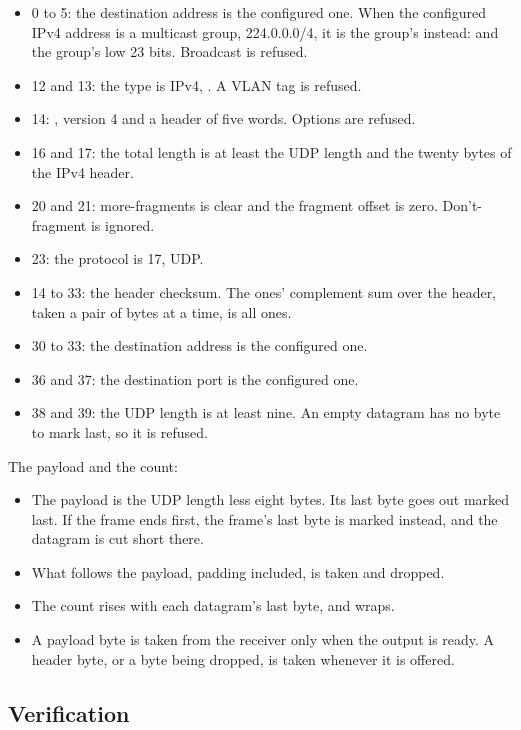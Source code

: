 \begin{itemize}
\item 0 to 5: the destination address is the configured one. When the
configured IPv4 address is a multicast group, 224.0.0.0/4, it is the
group's instead:  and the group's low 23 bits.
Broadcast is refused.
\item 12 and 13: the type is IPv4, . A VLAN tag is
refused.
\item 14: , version 4 and a header of five words. Options
are refused.
\item 16 and 17: the total length is at least the UDP length and the
twenty bytes of the IPv4 header.
\item 20 and 21: more-fragments is clear and the fragment offset is
zero. Don't-fragment is ignored.
\item 23: the protocol is 17, UDP.
\item 14 to 33: the header checksum. The ones' complement sum over the
header, taken a pair of bytes at a time, is all ones.
\item 30 to 33: the destination address is the configured one.
\item 36 and 37: the destination port is the configured one.
\item 38 and 39: the UDP length is at least nine. An empty datagram
has no byte to mark last, so it is refused.
\end{itemize}

The payload and the count:

\begin{itemize}
\item The payload is the UDP length less eight bytes. Its last byte
goes out marked last. If the frame ends first, the frame's last byte
is marked instead, and the datagram is cut short there.
\item What follows the payload, padding included, is taken and
dropped.
\item The count rises with each datagram's last byte, and wraps.
\item A payload byte is taken from the receiver only when the output
is ready. A header byte, or a byte being dropped, is taken whenever it
is offered.
\end{itemize}

\subsection*{Verification}


